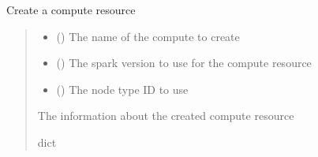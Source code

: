 \documentclass[letterpaper,10pt,english]{sphinxmanual}
\begin{document}
\begin{fulllineitems}
\begin{fulllineitems}
\label{\detokenize{aisquared.platform:aisquared.platform.DatabricksClient.DatabricksClient.create_compute}}
\pysigstartsignatures
{}
\pysigstopsignatures
\sphinxAtStartPar
Create a compute resource
\begin{quote}\begin{description}
\begin{itemize}
\item {} 
\sphinxAtStartPar
{} () \textendash{} The name of the compute to create

\item {} 
\sphinxAtStartPar
{} () \textendash{} The spark version to use for the compute resource

\item {} 
\sphinxAtStartPar
{} () \textendash{} The node type ID to use

\end{itemize}

\sphinxAtStartPar
{} \textendash{} The information about the created compute resource

\sphinxAtStartPar
dict

\end{description}\end{quote}

\end{fulllineitems}



\end{fulllineitems}
\end{document}
